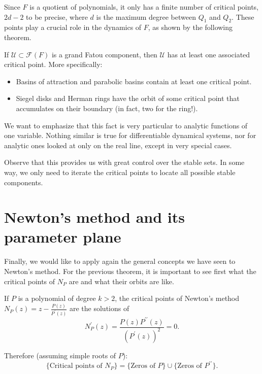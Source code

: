 \documentclass[12pt, a4paper]{article}
\begin{document}
Since $F$ is a quotient of polynomials, it only has a finite number of critical
points, $2d-2$ to be precise, where $d$ is the maximum degree between $Q_{1}$
and $Q_{2}$. These points play a crucial role in the dynamics of $F$, as shown
by the following theorem.

\begin{theorem}[\cite{7, 8}]
If $\mathcal{U}\subset\mathcal{F}(F)$ is a grand Fatou component, then
$\mathcal{U}$ has at least one associated critical point. More specifically:
\begin{itemize}
    \item Basins of attraction and parabolic basins contain at least one
    critical point.
    \item Siegel disks and Herman rings have the orbit of some critical point
    that accumulates on their boundary (in fact, two for the ring!).
\end{itemize}
\end{theorem}

We want to emphasize that this fact is very particular to analytic functions of
one variable. Nothing similar is true for differentiable dynamical systems, nor
for analytic ones looked at only on the real line, except in very special cases.

Observe that this provides us with great control over the stable sets. In some
way, we only need to iterate the critical points to locate all possible stable
components.

\section{Newton's method and its parameter plane}

Finally, we would like to apply again the general concepts we have seen to
Newton's method. For the previous theorem, it is important to see first what the
critical points of $N_{P}$ are and what their orbits are like.

If $P$ is a polynomial of degree $k>2$, the critical points of Newton's method
$N_{P}(z)=z-\frac{P(z)}{P^{\prime}(z)}$ are the solutions of
\begin{equation*}
    N_{P}^{\prime}(z)=\frac{P(z)P^{\prime\prime}(z)}{(P^{\prime}(z))^{2}}=0.
\end{equation*}

Therefore (assuming simple roots of $P$):
\begin{equation*}
    \{\text{Critical points of } N_{P}\} = \{\text{Zeros of } P\} \cup \{\text{Zeros of } P^{\prime\prime}\}.
\end{equation*}
\end{document}
